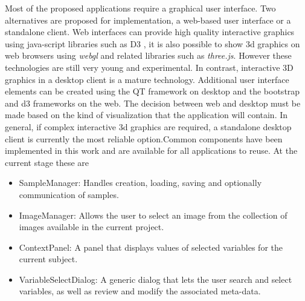 Most of the proposed applications require a graphical user interface. Two alternatives are proposed for implementation, a web-based user interface or a standalone client. Web interfaces can provide high quality interactive graphics using java-script libraries such as D3 \autocite{bostock_d3_2011}, it is also possible to show 3d graphics on web browsers using \emph{webgl} and related libraries such as \emph{three.js}. However these technologies are still very young and experimental. In contrast, interactive 3D graphics in a desktop client is a mature technology. Additional user interface elements can be created using the QT framework on desktop and the bootstrap and d3 frameworks on the web. The decision between web and desktop must be made based on the kind of visualization that the application will contain. In general, if complex interactive 3d graphics are required, a standalone desktop client is currently the most reliable option.Common components have been implemented in this work and are available for all applications to reuse. At the current stage these are

\begin{itemize}
\item SampleManager: Handles creation, loading, saving and optionally communication of samples.
\item ImageManager: Allows the user to select an image from the collection of images available in the current project.
\item ContextPanel: A panel that displays values of selected variables for the current subject.
\item VariableSelectDialog: A generic dialog that lets the user search and select variables, as well as review and modify the associated meta-data.
\end{itemize}


